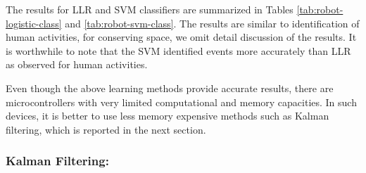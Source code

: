 \documentclass[letterpaper]{article}
\begin{document}
\begin{sloppy}
The results for LLR and SVM classifiers are summarized in Tables \ref{tab:robot-logistic-class} and 
\ref{tab:robot-svm-class}. The results are similar to identification of human activities, for 
conserving space, we omit detail discussion of the results. It is worthwhile to note that the SVM 
 identified events more accurately than LLR as observed for human activities.  





Even though the above learning methods provide accurate results, there are microcontrollers with 
very limited computational and memory capacities. In such devices, it is better to use less memory 
expensive methods such as Kalman filtering, which is reported in the next section.

\subsubsection{Kalman Filtering:}


\end{sloppy}
\end{document}
